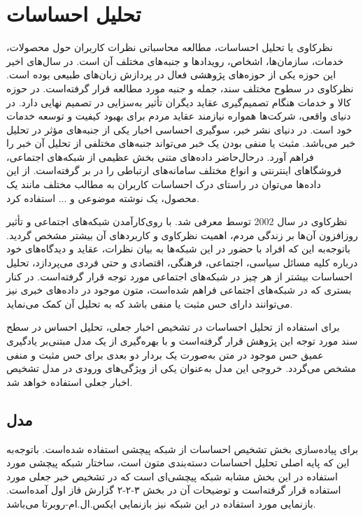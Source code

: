 \section{تحلیل احساسات}
نظرکاوی یا تحلیل احساسات، مطالعه محاسباتی نظرات کاربران حول محصولات، خدمات، سازمان‌ها، اشخاص، رویدادها و جنبه‌های مختلف آن است. در سال‌های اخیر این حوزه یکی از حوزه‌های پژوهشی فعال در پردازش زبان‌های طبیعی بوده است. نظرکاوی در سطوح مختلف سند، جمله و جنبه مورد مطالعه قرار گرفته‌است. در حوزه کالا و خدمات هنگام تصمیم‌گیری عقاید دیگران تأثیر به‌سزایی در تصمیم نهایی دارد. در دنیای واقعی، شرکت‌ها همواره نیازمند عقاید مردم برای بهبود کیفیت و توسعه خدمات خود است. در دنیای نشر خبر، سوگیری احساسی اخبار یکی از جنبه‌های مؤثر در تحلیل خبر می‌باشد. مثبت یا منفی بودن یک خبر می‌تواند جنبه‌های مختلفی از تحلیل آن خبر را فراهم آورد. درحال‌حاضر داده‌های متنی  بخش عظیمی از شبکه‌های اجتماعی، فروشگاهای اینترنتی و انواع مختلف سامانه‌های ارتباطی را در بر گرفته‌است. از این داده‌ها می‌توان در راستای درک احساسات کاربران به مطالب مختلف مانند یک محصول، یک نوشته موضوعی و ... استفاده کرد. 

نظر‌کاوی در سال 2002 توسط \citet{pang2002} معرفی شد. با روی‌کارآمدن شبکه‌های اجتماعی و تأثیر روزافزون آن‌ها بر زندگی مردم، اهمیت نظر‌کاوی و کاربردهای آن بیشتر مشخص گردید. باتوجه‌به این که افراد با حضور در این شبکه‌ها به بیان نظرات، عقاید و دیدگاه‌های خود درباره کلیه مسائل سیاسی، اجتماعی، فرهنگی، اقتصادی و حتی فردی می‌پردازد، تحلیل احساسات بیشتر از هر چیز در شبکه‌های اجتماعی مورد توجه قرار گرفته‌است. در کنار بستری که در شبکه‌های اجتماعی فراهم شده‌است، متون موجود در داده‌های خبری نیز می‌توانند دارای حس مثبت یا منفی باشد که به تحلیل آن کمک می‌نماید.

برای استفاده از تحلیل احساسات در تشخیص اخبار جعلی، تحلیل احساس در سطح سند مورد توجه این پژوهش قرار گرفته‌است و با بهره‌گیری از یک مدل مبتنی‌بر یادگیری عمیق حس موجود در متن به‌صورت یک بردار دو بعدی برای حس مثبت و منفی مشخص می‌گردد. خروجی این مدل به‌عنوان یکی از ویژگی‌های ورودی در مدل تشخیص اخبار جعلی استفاده خواهد شد.

\subsection{مدل}
برای پیاده‌سازی بخش تشخیص احساسات از شبکه پیچشی استفاده شده‌است. باتوجه‌به این که پایه اصلی تحلیل احساسات دسته‌بندی متون است، ساختار شبکه پیچشی مورد استفاده در این بخش مشابه شبکه پیچشی‌ای است که در تشخیص خبر جعلی مورد استفاده قرار گرفته‌است و توضیحات آن در بخش ۳-۲-۲ گزارش فاز اول آمده‌است.  بازنمایی مورد استفاده در این شبکه نیز بازنمایی ایکس.ال.ام-روبرتا می‌باشد.

